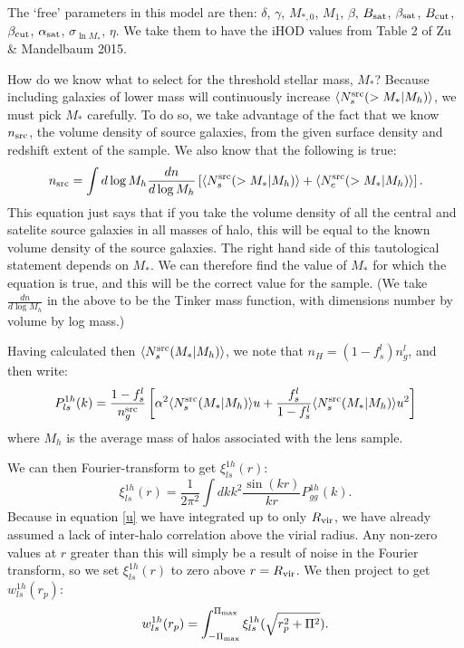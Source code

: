 \documentclass[onecolumn,amsmath,aps,fleqn, superscriptaddress]{revtex4}
\begin{document}
The `free' parameters in this model are then: $\delta$, $\gamma$, $M_{*,0}$, $M_1$, $\beta$, $B_{\rm sat}$, $\beta_{\rm sat}$, $B_{\rm cut}$, $\beta_{\rm cut}$, $\alpha_{\rm sat}$, $\sigma_{\ln M_*}$, $\eta$. We take them to have the iHOD values from Table 2 of Zu \& Mandelbaum 2015. 

How do we know what to select for the threshold stellar mass, $M_*$? Because including galaxies of lower mass will continuously increase $\langle  N_s^{\rm src} (>M_* | M_h) \rangle$, we must pick $M_*$ carefully. To do so, we take advantage of the fact that we know $n_{\rm src}$, the volume density of source galaxies, from the given surface density and redshift extent of the sample. We also know that the following is true:
\begin{equation}
n_{\rm src} = \int d \log M_h \frac{dn}{d\log M_h} \left[ \langle  N_s^{\rm src} (>M_* | M_h) \rangle + \langle  N_c^{\rm src} (>M_* | M_h) \rangle \right].
\label{getM*}
\end{equation}
This equation just says that if you take the volume density of all the central and satelite source galaxies in all masses of halo, this will be equal to the known volume density of the source galaxies. The right hand side of this tautological statement depends on $M_*$. We can therefore find the value of $M_*$ for which the equation is true, and this will be the correct value for the sample. (We take $\frac{dn}{d\log M_h}$ in the above to be the Tinker mass function, with dimensions number by volume by log mass.)

Having calculated then $\langle  N_s^{\rm src} (M_* | M_h) \rangle$, we note that $n_H = (1-f_s^l) n_g^l$, and then write:
\begin{equation}
P_{ls}^{1h}(k) = \frac{1-f_s^l}{n_g^{\rm src}}\left[\alpha^2  \langle  N_s^{\rm src} (M_* | M_h) \rangle u + \frac{f_s^l}{1-f_s^l} \langle  N_s^{\rm src} (M_* | M_h) \rangle u^2\right]
\label{1hpgg_fs}
\end{equation}
where $M_h$ is the average mass of halos associated with the lens sample.

We can then Fourier-transform to get $\xi^{1h}_{ls}(r)$:
\begin{equation}
\xi_{ls}^{1h}(r) = \frac{1}{2\pi^2} \int dk k^2 \frac{\sin(kr)}{kr} P_{gg}^{1h}(k).
\label{xils1h}
\end{equation}
Because in equation \ref{u} we have integrated up to only $R_{\rm vir}$, we have already assumed a lack of inter-halo correlation above the virial radius. Any non-zero values at $r$ greater than this will simply be a result of noise in the Fourier transform, so we set $\xi_{ls}^{1h}(r)$ to zero above $r= R_{\rm vir}$. We then project to get $w_{ls}^{1h}(r_p)$:
\begin{equation}
w_{ls}^{1h}(r_p) = \int_{-\Pi_{\rm max}}^{\Pi_{\rm max}} \xi_{ls}^{1h}(\sqrt{r_p^2 + \Pi^2}).
\label{wl1h}
\end{equation}
\end{document}
